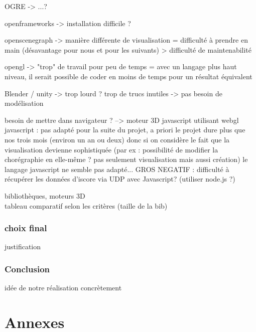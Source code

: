 \documentclass[paper=a4,12pt]{article}
\numberwithin{equation}{section}		%
\numberwithin{figure}{section}			%
\numberwithin{table}{section}				%
\begin{document}
OGRE -> ...? 

openframeworks -> installation difficile ?

openscenegraph -> manière différente de visualisation = difficulté à prendre en main (désavantage pour nous et pour les suivants) > difficulté de maintenabilité

opengl -> "trop" de travail pour peu de temps  = avec un langage plus haut niveau, il serait possible de coder en moins de temps pour un résultat équivalent

Blender / unity -> trop lourd ? trop de trucs inutiles 
				-> pas besoin de modélisation


besoin de mettre dans navigateur  ? --> moteur 3D javascript utilisant webgl
	javascript : pas adapté pour la suite du projet, a priori le projet dure plus que nos trois mois (environ un an ou deux) donc si on considère le fait que la visualisation devienne sophistiquée (par ex : possibilité de modifier la chorégraphie en elle-même ? pas seulement visualisation mais aussi création) le langage javascript ne semble pas adapté...
		GROS NEGATIF : difficulté à récupérer les données d'iscore via UDP avec Javascript? (utiliser node.js ?)
		


bibliothèques, moteurs 3D \\
tableau comparatif selon les critères (taille de la bib)

\section{choix final}
justification

\section{Conclusion}
idée de notre réalisation concrètement


  \newpage

%  
%  
%
  \appendix
  \part*{Annexes}
  
  

  
  

 


\end{document}
